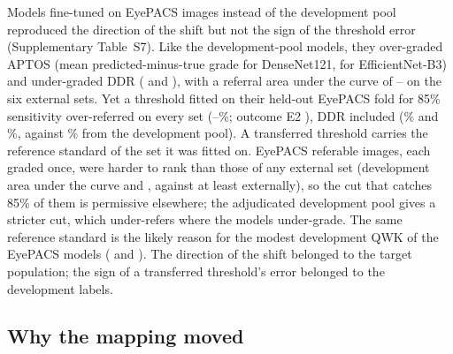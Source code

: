 Models fine-tuned on  EyePACS images instead of the development pool
reproduced the direction of the shift but not the sign of the threshold error (Supplementary
Table~S7). Like the development-pool models, they over-graded APTOS (mean predicted-minus-true grade
 for DenseNet121,  for EfficientNet-B3) and
under-graded DDR ( and ), with a referral area under the
curve of -- on the six external sets. Yet a threshold fitted on their
held-out EyePACS fold for 85\% sensitivity over-referred on every set
(--\%; outcome E2 ), DDR included
(\% and \%, against \% from the
development pool). A transferred threshold carries the reference standard of the set it was fitted
on. EyePACS referable images, each graded once, were harder to rank than those of any external set
(development area under the curve  and , against at least
 externally), so the cut that catches 85\% of them is permissive elsewhere; the
adjudicated development pool gives a stricter cut, which under-refers where the models under-grade.
The same reference standard is the likely reason for the modest development QWK of the EyePACS models
( and ). The direction of the shift belonged to the target
population; the sign of a transferred threshold's error belonged to the development labels.

\subsection{Why the mapping moved}

